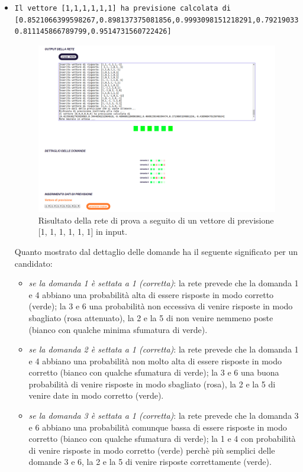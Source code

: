 \begin{itemize}
\item \begin{verbatim}Il vettore [1,1,1,1,1,1] ha previsione calcolata di
[0.8521066399598267,0.898137375081856,0.9993098151218291,0.792190337086403,
0.811145866789799,0.9514731560722426]
\end{verbatim}

\begin{figure}[H]
\centering
	\includegraphics[width=0.90\linewidth]{./image/rete_prova-vp1.png}
	\caption{Risultato della rete di prova a seguito di un vettore di previsione [1, 1, 1, 1, 1, 1] in input.}
	\label{Risultato della rete di prova a seguito di un vettore di previsione [1, 1, 1, 1, 1, 1] in input.}
\end{figure}
Quanto mostrato dal dettaglio delle domande ha il seguente significato per un candidato:
\begin{itemize}
\item \textit{se la domanda 1 \`e settata a 1 (corretta)}: la rete prevede che la domanda 1 e 4 abbiano una probabilit\`a alta di essere risposte in modo corretto (verde); la 3 e 6 una probabilit\`a non eccessiva di venire risposte in modo sbagliato (rosa attenuato), la 2 e la 5 di non venire nemmeno poste (bianco con qualche minima sfumatura di verde).
\item \textit{se la domanda 2 \`e settata a 1 (corretta)}: la rete prevede che la domanda 1 e 4 abbiano una probabilit\`a non molto alta di essere risposte in modo corretto (bianco con qualche sfumatura di verde); la 3 e 6 una buona probabilit\`a di venire risposte in modo sbagliato (rosa), la 2 e la 5 di venire date in modo corretto (verde).
\item \textit{se la domanda 3 \`e settata a 1 (corretta)}: la rete prevede che la domanda 3 e 6 abbiano una probabilit\`a comunque bassa di essere risposte in modo corretto (bianco con qualche sfumatura di verde); la 1 e 4 con probabilit\`a di venire risposte in modo corretto (verde) perch\`e pi\`u semplici delle domande 3 e 6, la 2 e la 5 di venire risposte correttamente (verde).

\end{itemize}
\end{itemize}
